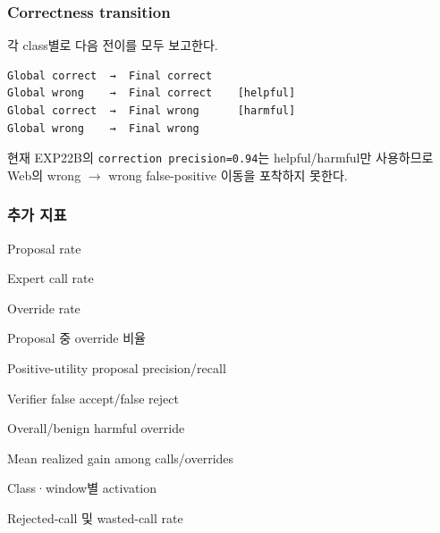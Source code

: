 \subsubsection{Correctness transition}
각 class별로 다음 전이를 모두 보고한다.


\begin{Verbatim}[breaklines=true,breakanywhere=true,fontsize=\scriptsize]
Global correct  →  Final correct
Global wrong    →  Final correct    [helpful]
Global correct  →  Final wrong      [harmful]
Global wrong    →  Final wrong

\end{Verbatim}
현재 EXP22B의 \texttt{correcti\allowbreak{}on preci\allowbreak{}sion=\allowbreak{}\allowbreak{}0.\allowbreak{}9\allowbreak{}4}는 helpful/\allowbreak{}harmful만 사용하므로 Web의 wrong \ensuremath{\rightarrow} wrong false-positive 이동을 포착하지 못한다.

\subsubsection{추가 지표}
\par\noindent \textbullet\enspace Proposal rate


\par\noindent \textbullet\enspace Expert call rate


\par\noindent \textbullet\enspace Override rate


\par\noindent \textbullet\enspace Proposal 중 override 비율


\par\noindent \textbullet\enspace Positive-utility proposal precision/\allowbreak{}recall


\par\noindent \textbullet\enspace Verifier false accept/\allowbreak{}false reject


\par\noindent \textbullet\enspace Overall/\allowbreak{}benign harmful override


\par\noindent \textbullet\enspace Mean realized gain among calls/\allowbreak{}overrides


\par\noindent \textbullet\enspace Class·window별 activation


\par\noindent \textbullet\enspace Rejected-call 및 wasted-call rate


